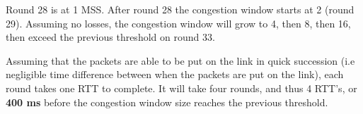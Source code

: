 \documentclass[11pt]{article}
\begin{document}
\begin{enumerate}[(a)]
      Round 28 is at 1 MSS. After round 28 the congestion window starts at 2 (round 29).
      Assuming no losses, the congestion window will grow to 4, then 8, then 16,
      then exceed the previous threshold on round 33.

      Assuming that the packets are able to be put on the link in quick succession
      (i.e negligible time difference between when the packets are put on the link),
      each round takes one RTT to complete. It will take four rounds, and thus
      4 RTT's, or \textbf{400 ms} before the congestion window size reaches the previous threshold.
  \end{enumerate}
\end{document}
